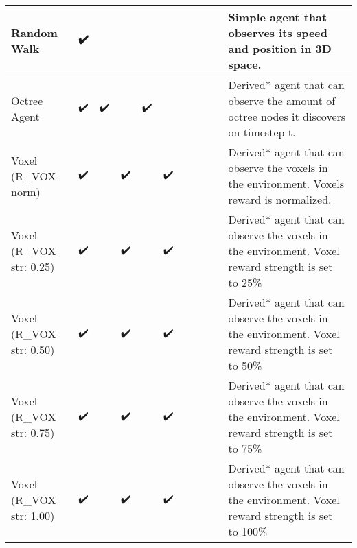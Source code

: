 {\begin{landscape}
\begin{table}[]
{\begin{tabular}{l|ccccccccc|l}
        \multicolumn{1}{|l|}{Random Walk} & \multicolumn{1}{c|}{✔️} & \multicolumn{1}{c|}{} & \multicolumn{1}{c|}{} & \multicolumn{1}{c|}{} & \multicolumn{1}{c|}{} & \multicolumn{1}{c|}{} & \multicolumn{1}{c|}{} & \multicolumn{1}{c|}{} &  & \multicolumn{1}{l|}{Simple agent that observes its speed and position in 3D space.} \\ \hline
        \multicolumn{1}{|l|}{Octree Agent} & \multicolumn{1}{c|}{✔️} & \multicolumn{1}{c|}{✔️} & \multicolumn{1}{c|}{} & \multicolumn{1}{c|}{✔️} & \multicolumn{1}{c|}{} & \multicolumn{1}{c|}{} & \multicolumn{1}{c|}{} & \multicolumn{1}{c|}{} &  & \multicolumn{1}{l|}{Derived* agent that can observe the amount of octree nodes it discovers on timestep t.} \\ \hline
        \multicolumn{1}{|l|}{Voxel (R\_VOX norm)} & \multicolumn{1}{c|}{✔️} & \multicolumn{1}{c|}{} & \multicolumn{1}{c|}{✔️} & \multicolumn{1}{c|}{} & \multicolumn{1}{c|}{✔️} & \multicolumn{1}{c|}{} & \multicolumn{1}{c|}{} & \multicolumn{1}{c|}{} &  & \multicolumn{1}{l|}{Derived* agent that can observe the voxels in the environment. Voxels reward is normalized.} \\ \hline
        \multicolumn{1}{|l|}{Voxel (R\_VOX str: 0.25)} & \multicolumn{1}{c|}{✔️} & \multicolumn{1}{c|}{} & \multicolumn{1}{c|}{✔️} & \multicolumn{1}{c|}{} & \multicolumn{1}{c|}{✔️} & \multicolumn{1}{c|}{} & \multicolumn{1}{c|}{} & \multicolumn{1}{c|}{} &  & \multicolumn{1}{l|}{Derived* agent that can observe the voxels in the environment. Voxel reward strength is set to 25\%} \\ \hline
        \multicolumn{1}{|l|}{Voxel (R\_VOX str: 0.50)} & \multicolumn{1}{c|}{✔️} & \multicolumn{1}{c|}{} & \multicolumn{1}{c|}{✔️} & \multicolumn{1}{c|}{} & \multicolumn{1}{c|}{✔️} & \multicolumn{1}{c|}{} & \multicolumn{1}{c|}{} & \multicolumn{1}{c|}{} &  & \multicolumn{1}{l|}{Derived* agent that can observe the voxels in the environment. Voxel reward strength is set to 50\%} \\ \hline
        \multicolumn{1}{|l|}{Voxel (R\_VOX str: 0.75)} & \multicolumn{1}{c|}{✔️} & \multicolumn{1}{c|}{} & \multicolumn{1}{c|}{✔️} & \multicolumn{1}{c|}{} & \multicolumn{1}{c|}{✔️} & \multicolumn{1}{c|}{} & \multicolumn{1}{c|}{} & \multicolumn{1}{c|}{} &  & \multicolumn{1}{l|}{Derived* agent that can observe the voxels in the environment. Voxel reward strength is set to 75\%} \\ \hline
        \multicolumn{1}{|l|}{Voxel (R\_VOX str: 1.00)} & \multicolumn{1}{c|}{✔️} & \multicolumn{1}{c|}{} & \multicolumn{1}{c|}{✔️} & \multicolumn{1}{c|}{} & \multicolumn{1}{c|}{✔️} & \multicolumn{1}{c|}{} & \multicolumn{1}{c|}{} & \multicolumn{1}{c|}{} &  & \multicolumn{1}{l|}{Derived* agent that can observe the voxels in the environment. Voxel reward strength is set to 100\%} \\ \hline

\end{tabular}}
\end{table}
\end{landscape}}

